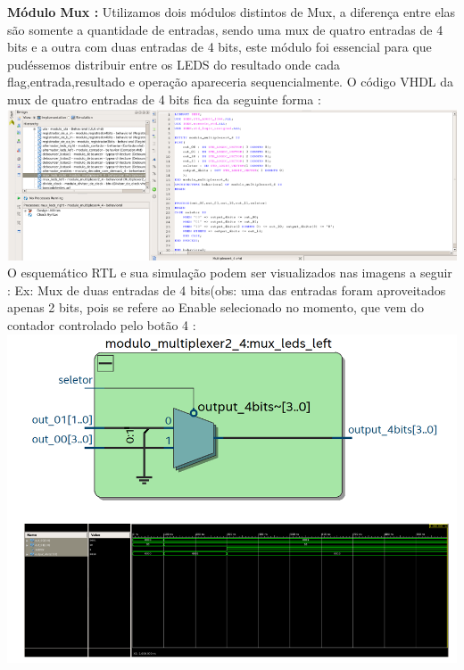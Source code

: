 \documentclass[11pt]{book}
\begin{document}
\textbf{Módulo Mux :} 
\newline\newline
Utilizamos dois módulos distintos de Mux, a diferença entre elas são somente a quantidade de entradas, sendo uma mux de quatro entradas de 4 bits e a outra com duas entradas de 4 bits, este módulo foi essencial para que pudéssemos distribuir entre os LEDS do resultado onde cada flag,entrada,resultado e operação apareceria sequencialmente.
O código VHDL da mux de quatro entradas de 4 bits fica da seguinte forma :
\newline\newline
\includegraphics[width=1.1\textwidth]{codigo_multiplexer44.png}%
\newline
O esquemático RTL e sua simulação podem ser visualizados nas imagens a seguir :
\newline
Ex: Mux de duas entradas de 4 bits(obs: uma das entradas foram aproveitados apenas 2 bits, pois se refere ao Enable selecionado no momento, que vem do contador controlado pelo botão 4 :
\newline
\includegraphics[width=1.1\textwidth]{RTL_mux24_simulacao_multiplexador24.png}%
\newline
\end{document}
